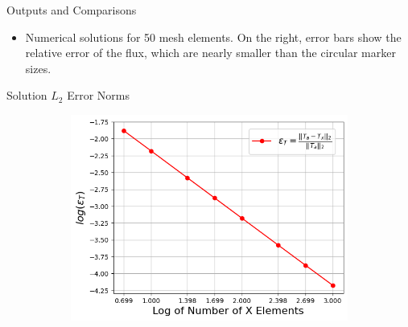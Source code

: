 \documentclass[9pt,t]{beamer}
\begin{document}
\begin{frame}{Outputs and Comparisons}
\begin{figure}[T]
\begin{subfigure}[b]{0.495\linewidth}
        \end{subfigure}
    \end{figure}
    \begin{itemize}
        \item Numerical solutions for 50 mesh elements. On the right, error bars show the relative error of the flux, which are nearly smaller than the circular marker sizes.
    \end{itemize}
\end{frame}

\begin{frame}{Solution $L_{2}$ Error Norms}
    \begin{figure}[T]
        \hspace*{-0.9cm}
        \begin{subfigure}{0.4995\linewidth}
            \includegraphics[height=0.85\linewidth]{figures/temp_error_norms.png}
        \end{subfigure}\hspace*{0.85cm}
        \begin{subfigure}{0.4995\linewidth}

\end{subfigure}
\end{figure}
\end{frame}
\end{document}

